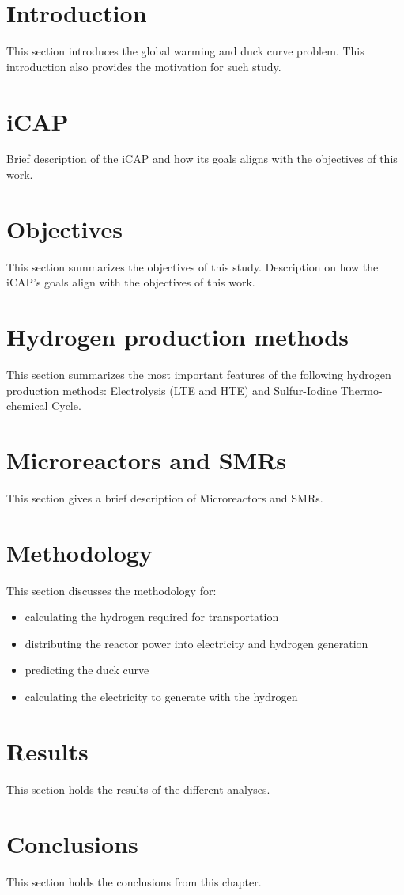 \section{Introduction}

This section introduces the global warming and duck curve problem.
This introduction also provides the motivation for such study.

\section{iCAP}

Brief description of the iCAP and how its goals aligns with the objectives of this work.

\section{Objectives}

This section summarizes the objectives of this study.
Description on how the iCAP's goals align with the objectives of this work.

\section{Hydrogen production methods}

This section summarizes the most important features of the following hydrogen production methods: Electrolysis (LTE and HTE) and Sulfur-Iodine Thermo-chemical Cycle.

\section{Microreactors and SMRs}

This section gives a brief description of Microreactors and SMRs.

\section{Methodology}

This section discusses the methodology for:
\begin{itemize}
\item calculating the hydrogen required for transportation
\item distributing the reactor power into electricity and hydrogen generation
\item predicting the duck curve
\item calculating the electricity to generate with the hydrogen
\end{itemize}

\section{Results}

This section holds the results of the different analyses.

\section{Conclusions}

This section holds the conclusions from this chapter.


